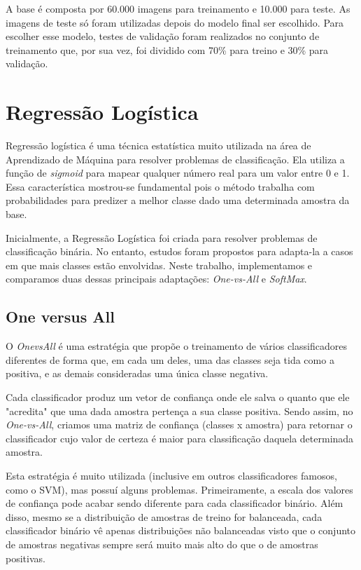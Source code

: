 \documentclass[conference]{IEEEtran}
\begin{document}
	A base é composta por 60.000 imagens para treinamento e 10.000 para teste. As imagens de teste só foram utilizadas depois do modelo final ser escolhido. Para escolher esse modelo, testes de validação foram realizados no conjunto de treinamento que, por sua vez, foi dividido com 70\% para treino e 30\% para validação.
	
\section{Regressão Logística}

Regressão logística é uma técnica estatística muito utilizada na área de Aprendizado de Máquina para resolver problemas de classificação. Ela utiliza a função de \textit{sigmoid} para mapear qualquer número real para um valor entre 0 e 1. Essa característica mostrou-se fundamental pois o método trabalha com probabilidades para predizer a melhor classe dado uma determinada amostra da base. \par

Inicialmente, a Regressão Logística foi criada para resolver problemas de classificação binária. No entanto, estudos foram propostos para adapta-la a casos em que mais classes estão envolvidas. Neste trabalho, implementamos e comparamos duas dessas principais adaptações: \textit{One-vs-All} e \textit{SoftMax}.

\subsection{One versus All}
O \textit{OnevsAll} é uma estratégia que propõe o treinamento de vários classificadores diferentes de forma que, em cada um deles, uma das classes seja tida como a positiva, e as demais consideradas uma única classe negativa.\par
Cada classificador produz um vetor de confiança onde ele salva o quanto que ele "acredita" que uma dada amostra pertença a sua classe positiva. Sendo assim, no \textit{One-vs-All}, criamos uma matriz de confiança (classes x amostra) para retornar o classificador cujo valor de certeza é maior para classificação daquela determinada amostra.\par
Esta estratégia é muito utilizada (inclusive em outros classificadores famosos, como o SVM), mas possuí alguns problemas. Primeiramente, a escala dos valores de confiança pode acabar sendo diferente para cada classificador binário. Além disso, mesmo se a distribuição de amostras de treino for balanceada, cada classificador binário vê apenas distribuições não balanceadas visto que o conjunto de amostras negativas sempre será muito mais alto do que o de amostras positivas.
\end{document}
